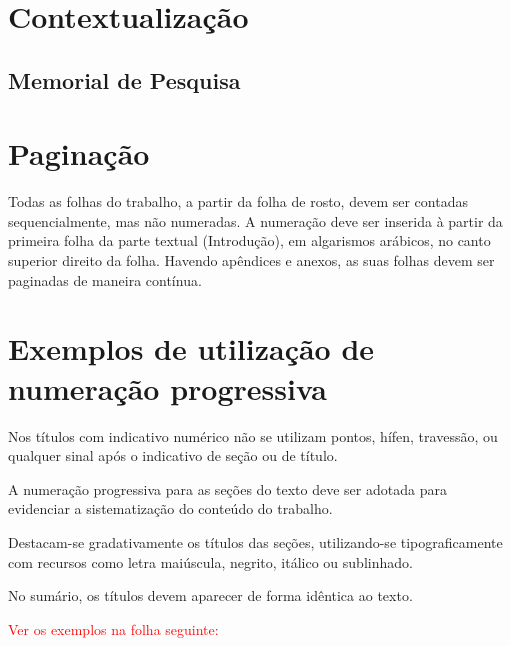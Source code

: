 




\section{Contextualização}

\subsection{Memorial de Pesquisa}


\section{Paginação}

Todas as folhas do trabalho, a partir da folha de rosto, devem ser contadas sequencialmente, mas não numeradas. A numeração deve ser inserida à partir da primeira folha da parte textual (Introdução), em algarismos arábicos, no canto superior direito da folha. Havendo apêndices e anexos, as suas folhas devem ser paginadas de maneira contínua.

\section{Exemplos de utilização de numeração progressiva}

Nos títulos com indicativo numérico não se utilizam pontos, hífen, travessão, ou qualquer sinal após o indicativo de seção ou de título. 

A numeração progressiva para as seções do texto deve ser adotada para evidenciar a sistematização do conteúdo do trabalho. 

Destacam-se gradativamente os títulos das seções, utilizando-se tipograficamente com recursos como letra maiúscula, negrito, itálico ou sublinhado. 

No sumário, os títulos devem aparecer de forma idêntica ao texto.

\textcolor{red}{Ver os exemplos na folha seguinte:}

